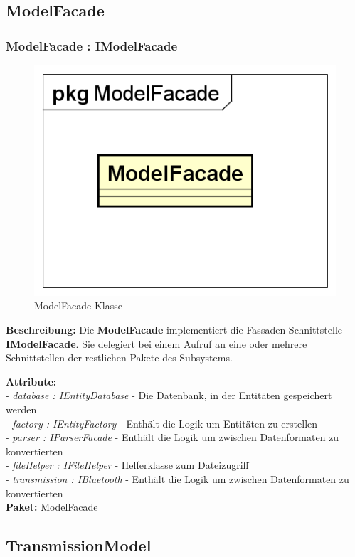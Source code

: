 \documentclass[a4paper]{scrreprt}
\begin{document}
\subsection{ModelFacade}
\subsubsection{ModelFacade : IModelFacade}
\begin{figure}[H]
\centering
\includegraphics[width=0.45\textheight]{graphics/Klassendiagramme/Model/ModelFacade.png}
\caption{ModelFacade Klasse}
\end{figure}
\textbf{Beschreibung:} Die \textbf{ModelFacade} implementiert die Fassaden-Schnittstelle \textbf{IModelFacade}. Sie delegiert bei einem Aufruf an eine oder mehrere Schnittstellen der restlichen Pakete des Subsystems.

\textbf{Attribute:}\\
- \textit{database : IEntityDatabase} - Die Datenbank, in der Entitäten gespeichert werden\\
- \textit{factory : IEntityFactory} - Enthält die Logik um Entitäten zu erstellen\\
- \textit{parser : IParserFacade} - Enthält die Logik um zwischen Datenformaten zu konvertierten\\
- \textit{fileHelper : IFileHelper} - Helferklasse zum Dateizugriff\\
- \textit{transmission : IBluetooth} - Enthält die Logik um zwischen Datenformaten zu konvertierten\\

\textbf{Paket:} ModelFacade

\subsection{TransmissionModel}
\end{document}
